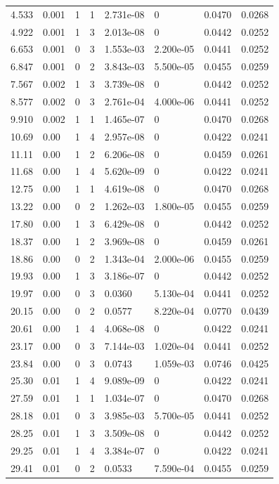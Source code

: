 \documentclass[preview]{standalone}
\begin{document}
{{\begin{tabular}{L{1.2cm}C{1.2cm} C{0.3cm}C{0.5cm} C{1.4cm}C{1.4cm} C{1.4cm}C{1.4cm}}
  4.533  &  0.001  & 1     &  1 &  2.731e-08  & 0  & 0.0470 &  0.0268   \\ 
  4.922  &  0.001  & 1     &  3 &  2.013e-08  & 0  & 0.0442 &  0.0252   \\ 
  6.653  &  0.001  & 0     &  3 &  1.553e-03  & 2.200e-05  & 0.0441 &  0.0252   \\ 
  6.847  &  0.001  & 0     &  2 &  3.843e-03  & 5.500e-05  & 0.0455 &  0.0259   \\ 
  7.567  &  0.002  & 1     &  3 &  3.739e-08  & 0  & 0.0442 &  0.0252   \\ 
  8.577  &  0.002  & 0     &  3 &  2.761e-04  & 4.000e-06  & 0.0441 &  0.0252   \\ 
  9.910  &  0.002  & 1     &  1 &  1.465e-07  & 0  & 0.0470 &  0.0268   \\ 
  10.69  &  0.00  & 1     &  4 &  2.957e-08  & 0  & 0.0422 &  0.0241   \\ 
  11.11  &  0.00  & 1     &  2 &  6.206e-08  & 0  & 0.0459 &  0.0261   \\ 
  11.68  &  0.00  & 1     &  4 &  5.620e-09  & 0  & 0.0422 &  0.0241   \\ 
  12.75  &  0.00  & 1     &  1 &  4.619e-08  & 0  & 0.0470 &  0.0268   \\ 
  13.22  &  0.00  & 0     &  2 &  1.262e-03  & 1.800e-05  & 0.0455 &  0.0259   \\ 
  17.80  &  0.00  & 1     &  3 &  6.429e-08  & 0  & 0.0442 &  0.0252   \\ 
  18.37  &  0.00  & 1     &  2 &  3.969e-08  & 0  & 0.0459 &  0.0261   \\ 
  18.86  &  0.00  & 0     &  2 &  1.343e-04  & 2.000e-06  & 0.0455 &  0.0259   \\ 
  19.93  &  0.00  & 1     &  3 &  3.186e-07  & 0  & 0.0442 &  0.0252   \\ 
  19.97  &  0.00  & 0     &  3 &  0.0360  & 5.130e-04  & 0.0441 &  0.0252   \\ 
  20.15  &  0.00  & 0     &  2 &  0.0577  & 8.220e-04  & 0.0770 &  0.0439   \\ 
  20.61  &  0.00  & 1     &  4 &  4.068e-08  & 0  & 0.0422 &  0.0241   \\ 
  23.17  &  0.00  & 0     &  3 &  7.144e-03  & 1.020e-04  & 0.0441 &  0.0252   \\ 
  23.84  &  0.00  & 0     &  3 &  0.0743  & 1.059e-03  & 0.0746 &  0.0425   \\ 
  25.30  &  0.01  & 1     &  4 &  9.089e-09  & 0  & 0.0422 &  0.0241   \\ 
  27.59  &  0.01  & 1     &  1 &  1.034e-07  & 0  & 0.0470 &  0.0268   \\ 
  28.18  &  0.01  & 0     &  3 &  3.985e-03  & 5.700e-05  & 0.0441 &  0.0252   \\ 
  28.25  &  0.01  & 1     &  3 &  3.509e-08  & 0  & 0.0442 &  0.0252   \\ 
  29.25  &  0.01  & 1     &  4 &  3.384e-07  & 0  & 0.0422 &  0.0241   \\ 
  29.41  &  0.01  & 0     &  2 &  0.0533  & 7.590e-04  & 0.0455 &  0.0259   \\ 
\hline 
\end{tabular} 

}}
\end{document}
